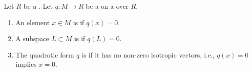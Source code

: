 \begin{definition} \label{definition:isotropic_vector_subspace_anisotropic_quadratic_form_of_a_module_over_a_commutative_ring_with_quadratic_form}
Let $R$ be a . Let $q: M \to R$ be a  on a  over $R$.
\begin{enumerate}
\item An element $x \in M$ is  if $q(x) = 0$.
\item A subspace $L \subset M$ is  if $q(L) = 0$.
\item The quadratic form $q$ is  if it has no non-zero isotropic vectors, i.e., $q(x) = 0$ implies $x = 0$.
\end{enumerate}
\end{definition}